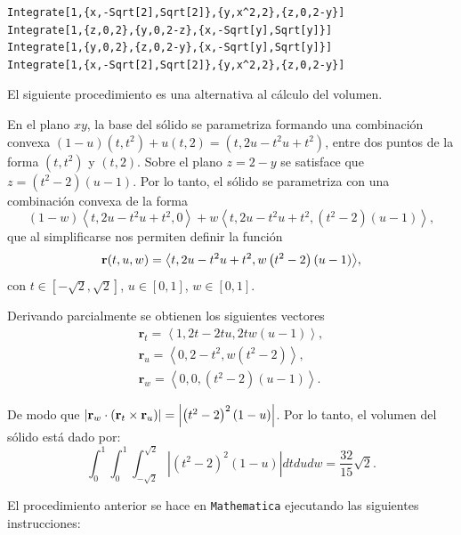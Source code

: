 \begin{tcolorbox}[title=\bf Instrucción en \verb"Mathematica"]\begin{Verbatim}[formatcom=\letraverbatim]
Integrate[1,{x,-Sqrt[2],Sqrt[2]},{y,x^2,2},{z,0,2-y}]
Integrate[1,{z,0,2},{y,0,2-z},{x,-Sqrt[y],Sqrt[y]}]
Integrate[1,{y,0,2},{z,0,2-y},{x,-Sqrt[y],Sqrt[y]}]
Integrate[1,{x,-Sqrt[2],Sqrt[2]},{y,x^2,2},{z,0,2-y}]
\end{Verbatim}
\end{tcolorbox}

El siguiente procedimiento es una alternativa al cálculo del volumen.

En el plano $xy$, la base del sólido se parametriza formando una combinación convexa
$\left( 1-u\right) \left( t,t^2\right) +u\left(t,2\right) = \left( t,2u-t^2u+t^2\right)$,
entre dos puntos de la forma $\left( t,t^2\right) $ y $\left( t,2\right)$.
Sobre el plano $z=2-y$ se satisface que $z=(t^2-2)(u-1) $. Por lo tanto, el sólido se parametriza con una combinación convexa de la forma
\[\left( 1-w\right) \left\langle t,2u-t^2u+t^2,0\right\rangle +w\left\langle t,2u-t^2u+t^2,\left(t^2-2\right) \left( u-1\right) \right\rangle\!,\]
que al simplificarse nos permiten definir la función
\[{\bf r}(t,u,w)=\left\langle t,2u-t^2u+t^2,w\left( t^2-2\right) \left( u-1\right) \right\rangle\!,\]
con $t\in [-\sqrt{2},\sqrt{2}]$, $u\in [0,1]$, $w\in [0,1]$.

Derivando parcialmente se obtienen los siguientes vectores
\begin{gather*}
\mathbf{r}_{t} = \left\langle 1,2t-2tu,2tw\left( u-1\right) \right\rangle\!, \\
\mathbf{r}_{u}= \left\langle 0,2-t^2,w\left( t^2-2\right)\right\rangle\!, \\
\mathbf{r}_{w} =\left\langle 0,0,\left( t^2-2\right) \left( u-1\right)\right\rangle\!.
\end{gather*}

De modo que $\left\vert {\bf r}_{w}\cdot \left({\bf r}_{t}\times {\bf r}_{u}\right) \right\vert
=\left\vert \left( t^2-2\right) ^2\left( 1-u\right)\right\vert $.
Por lo tanto, el volumen del sólido está dado por:
%
\[\int_{0}^{1}\int_{0}^{1}\int_{-\sqrt{2}}^{\sqrt{2}}\left\vert
\left( t^2-2\right) ^2\left( 1-u\right) \right\vert dtdudw= \frac{32}{15}\sqrt{2}.\]
%

El procedimiento anterior se hace en \verb"Mathematica" ejecutando las siguientes instrucciones:

